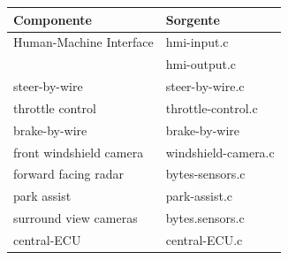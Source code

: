 \documentclass[11pt, openany]{article}
\theoremstyle{definition}
\theoremstyle{plain}
\theoremstyle{remark}
\begin{document}
			\begin{tcolorbox}[width=\textwidth,colback={Cornsilk2}]\label{tab:sorgenti}
				\begin{tabularx}{\textwidth}{p{8cm}  l}
					\textbf{Componente}			&	\textbf{Sorgente}	\\\toprule
					Human-Machine Interface 	& 	hmi-input.c			\\
												&	hmi-output.c		\\\midrule
					steer-by-wire				&	steer-by-wire.c		\\\midrule
					throttle control			&	throttle-control.c	\\\midrule
					brake-by-wire				&	brake-by-wire		\\\midrule
					front windshield camera		&	windshield-camera.c	\\\midrule
					forward facing radar		&	bytes-sensors.c		\\\midrule
					park assist					&	park-assist.c		\\\midrule
					surround view cameras		&	bytes.sensors.c		\\\midrule
					central-ECU					&	central-ECU.c
				\end{tabularx}
			\end{tcolorbox}
\end{document}
